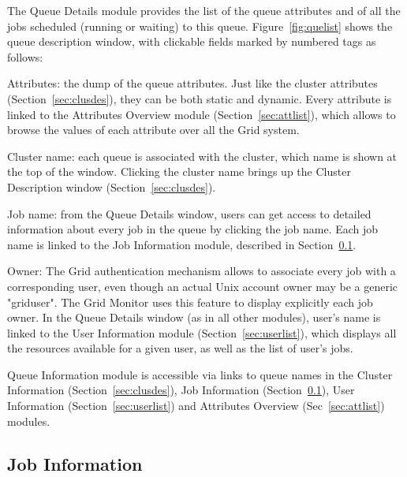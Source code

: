 \documentclass{article}
\begin{document}
The Queue Details module provides the list of the queue attributes and
of all the jobs scheduled (running or waiting) to this queue.
Figure~\ref{fig:quelist} shows the queue description window,
with clickable fields marked by numbered tags as follows:

\begin{list}{)}{ \itemsep=-0.5mm}
\item \textsf{Attributes}:  the dump of the
  queue attributes. Just like the cluster attributes
  (Section~\ref{sec:clusdes}), they can be both static and
  dynamic. Every attribute is linked to the Attributes Overview module
  (Section~\ref{sec:attlist}), which allows to browse the values of
  each attribute over all the Grid system.
\item \textsf{Cluster name}: each queue is associated with the
  cluster, which name is shown at the top of the window. Clicking the
  cluster name brings up the Cluster Description window
  (Section~\ref{sec:clusdes}).
\item \textsf{Job name}: from the Queue Details window, users can get
  access to detailed information about every job  in the queue by clicking the job name. Each
  job name is linked to the Job Information module, described in
  Section~\ref{sec:jobstat}.
\item \textsf{Owner}:  The Grid authentication
  mechanism allows to associate every job with a corresponding user,
  even though an actual Unix account owner may be a generic
  "griduser". The Grid Monitor uses this feature to display explicitly
  each job owner. In the Queue Details window (as in all other
  modules), user's name is linked to the User Information module
  (Section~\ref{sec:userlist}), which displays all the resources
  available for a given user, as well as the list of user's jobs.
\end{list}

Queue Information module is accessible via links to queue names in the
Cluster Information (Section~\ref{sec:clusdes}), Job Information
(Section~\ref{sec:jobstat}), User Information
(Section~\ref{sec:userlist}) and Attributes Overview
(Sec~\ref{sec:attlist}) modules.

\subsection{Job Information}
\label{sec:jobstat}
\end{document}
